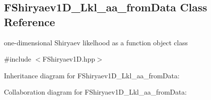 \hypertarget{classFShiryaev1D__Lkl__aa__fromData}{\subsection{\-F\-Shiryaev1\-D\-\_\-\-Lkl\-\_\-aa\-\_\-from\-Data \-Class \-Reference}
\label{classFShiryaev1D__Lkl__aa__fromData}
}


one-\/dimensional \-Shiryaev likelhood as a function object class  




{\ttfamily \#include $<$\-F\-Shiryaev1\-D.\-hpp$>$}



\-Inheritance diagram for \-F\-Shiryaev1\-D\-\_\-\-Lkl\-\_\-aa\-\_\-from\-Data\-:


\-Collaboration diagram for \-F\-Shiryaev1\-D\-\_\-\-Lkl\-\_\-aa\-\_\-from\-Data\-:

